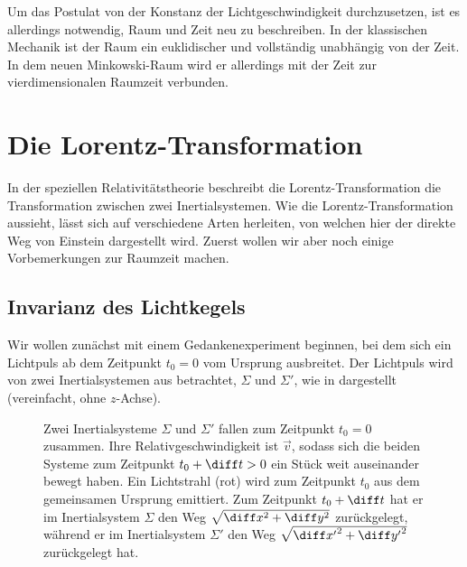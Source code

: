 Um das Postulat von der Konstanz der Lichtgeschwindigkeit durchzusetzen, ist es allerdings notwendig, Raum und Zeit neu zu beschreiben.
In der klassischen Mechanik ist der Raum ein euklidischer und vollständig unabhängig von der Zeit. In dem neuen Minkowski-Raum wird er allerdings mit der Zeit zur vierdimensionalen Raumzeit verbunden.


\section{Die Lorentz-Transformation}

In der speziellen Relativitätstheorie beschreibt die Lorentz-Transformation die Transformation zwischen zwei Inertialsystemen.
Wie die Lorentz-Transformation aussieht, lässt sich auf verschiedene Arten herleiten, von welchen hier der direkte Weg von Einstein dargestellt wird. Zuerst wollen wir aber noch einige Vorbemerkungen zur Raumzeit machen.


\subsection{Invarianz des Lichtkegels}

Wir wollen zunächst mit einem Gedankenexperiment beginnen, bei dem sich ein Lichtpuls ab dem Zeitpunkt $t_0=0$ vom Ursprung ausbreitet.
Der Lichtpuls wird von zwei Inertialsystemen aus betrachtet, $\Sigma$ und $\Sigma'$, wie in  dargestellt (vereinfacht, ohne $z$-Achse).

\begin{figure}[htb]
    \centering
    \tfigSRTGedankenExperimentLichtkegel
    \caption{Zwei Inertialsysteme $\Sigma$ und $\Sigma'$ fallen zum Zeitpunkt $t_0=0$ zusammen. Ihre Relativgeschwindigkeit ist $\vec v$, sodass sich die beiden Systeme zum Zeitpunkt $t_0+\diff t>0$ ein Stück weit auseinander bewegt haben.
    Ein Lichtstrahl (rot) wird zum Zeitpunkt $t_0$ aus dem gemeinsamen Ursprung emittiert.
    Zum Zeitpunkt $t_0+\diff t$ hat er im Inertialsystem $\Sigma$ den Weg $\sqrt{\diff x^2+\diff y^2}$ zurückgelegt, während er im Inertialsystem $\Sigma'$ den Weg $\sqrt{{\diff x'}^2+{\diff y'}^2}$ zurückgelegt hat. }
    \label{fig:srt_gedankenexperiment_lichtkegel}
\end{figure}


